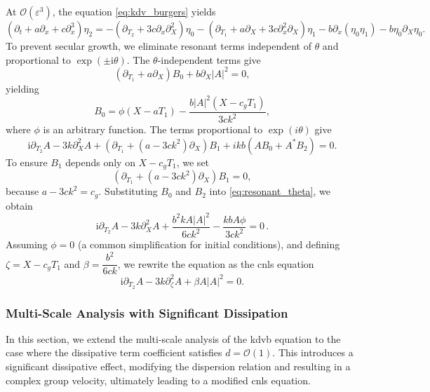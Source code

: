\documentclass[alpha-refs, 12pt]{wiley-article}
\renewcommand{\O}{\mathcal{O}}
\newcommand{\ui}{\mathrm{i}}
\newcommand{\eps}{\varepsilon}
\begin{document}
At $\O(\eps^3)$, the equation \eqref{eq:kdv_burgers} yields
\begin{equation}\label{eq:third_order}
  \left( \partial_t + a \partial_x + c \partial_x^3 \right) \eta_2 = - \left( \partial_{T_2} + 3 c \partial_x \partial_X^2 \right) \eta_0 - \left( \partial_{T_1} + a \partial_X + 3 c \partial_x^2 \partial_X \right) \eta_1 - b \partial_x ( \eta_0 \eta_1 ) - b \eta_0 \partial_X \eta_0.
\end{equation}
To prevent secular growth, we eliminate resonant terms independent of $\theta$ and proportional to $\exp(\pm \ui \theta)$. The $\theta$-independent terms give
\begin{equation}\label{eq:B0_equation}
  \left( \partial_{T_1} + a \partial_X \right) B_0 + b \partial_X |A|^2 = 0,
\end{equation}
yielding
\[
  B_0 = \phi(X - a T_1) - \frac{b |A|^2 (X - c_g T_1)}{3 c k^2},
\]
where $\phi$ is an arbitrary function. The terms proportional to $\exp(i \theta)$ give
\begin{equation}\label{eq:resonant_theta}
  \ui \partial_{T_2} A - 3 k \partial_X^2 A + \left( \partial_{T_1} + (a - 3 c k^2) \partial_X \right) B_1 + i k b \left( A B_0 + A^* B_2 \right) = 0.
\end{equation}
To ensure $B_1$ depends only on $X - c_g T_1$, we set
\[
\left( \partial_{T_1} + (a - 3 c k^2) \partial_X \right) B_1 = 0,
\]
because $a - 3 c k^2 = c_g$. Substituting $B_0$ and $B_2$ into \eqref{eq:resonant_theta}, we obtain
\begin{equation*}%
  \ui \partial_{T_2} A - 3 k \partial_X^2 A + \frac{b^2 k A |A|^2}{6 c k^2} - \frac{k b A \phi}{3 c k^2} = 0\,.
\end{equation*}
Assuming $\phi = 0$ (a common simplification for initial conditions), and defining $\zeta = X - c_g T_1$ and $\beta = \dfrac{b^2}{6 c k}$, we rewrite the equation as the \acrshort{cnls} equation
\begin{equation}\label{eq:NLS_final}
  \ui \partial_{T_2} A - 3 k \partial_\zeta^2 A + \beta A |A|^2 = 0.
\end{equation}

\subsubsection{Multi-Scale Analysis with Significant Dissipation}

In this section, we extend the multi-scale analysis of the \acrshort{kdvb} equation to the case where the dissipative term coefficient satisfies $d = \O(1)$. This introduces a significant dissipative effect, modifying the dispersion relation and resulting in a complex group velocity, ultimately leading to a modified \acrfull{cnls} equation.
\end{document}
